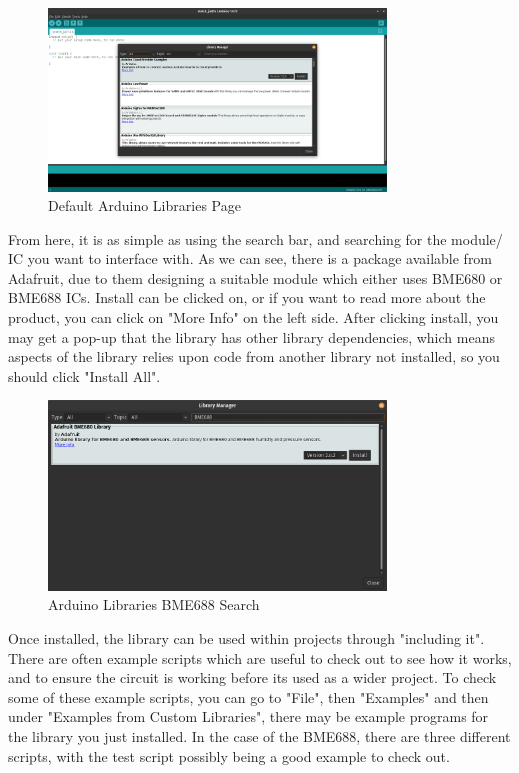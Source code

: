\documentclass[a4paper,11pt]{report}
\begin{document}
\begin{figure}[H]
\centering
\includegraphics[width=0.8\textwidth]{screenshots/arduinolibrariespage}
\caption{Default Arduino Libraries Page}
\end{figure}

From here, it is as simple as using the search bar, and searching for the module/ IC you want to interface with. As we can see, there is a package available from Adafruit, due to them designing a suitable module which either uses BME680 or BME688 ICs. Install can be clicked on, or if you want to read more about the product, you can click on "More Info" on the left side. After clicking install, you may get a pop-up that the library has other library dependencies, which means aspects of the library relies upon code from another library not installed, so you should click "Install All".

\begin{figure}[H]
\centering
\includegraphics[width=0.8\textwidth]{screenshots/arduinolibrariessearch}
\caption{Arduino Libraries BME688 Search}
\end{figure}

Once installed, the library can be used within projects through "including it". There are often example scripts which are useful to check out to see how it works, and to ensure the circuit is working before its used as a wider project. To check some of these example scripts, you can go to "File", then "Examples" and then under "Examples from Custom Libraries", there may be example programs for the library you just installed. In the case of the BME688, there are three different scripts, with the test script possibly being a good example to check out.
\end{document}
